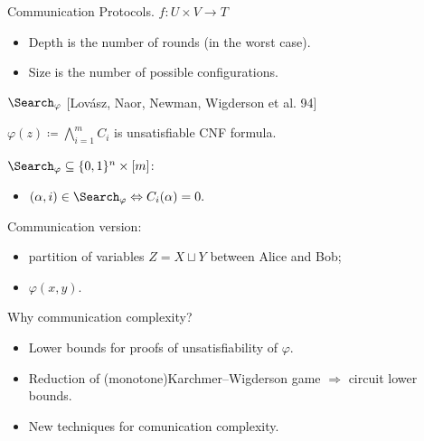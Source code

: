 \begin{frame}{Communication Protocols. $f\colon U \times V \to T$}
    \begin{center}
    	    
    \end{center}

    \pause
    \pause
    \pause
	\pause

    \begin{itemize}
        \item Depth is the number of rounds (in the worst case).
        \item Size is the number of possible configurations.
    \end{itemize}
\end{frame}

\begin{frame}{$\Search_{\varphi}$ [Lov{\'{a}}sz, Naor, Newman, Wigderson et al. 94]}

    $\varphi(z) \coloneqq \bigwedge\limits_{i = 1}^{m} C_i$ is unsatisfiable CNF formula.
    \pause
    
    $\Search_{\varphi} \subseteq \{0, 1\}^n \times [m]$:
    \begin{itemize}
        \item $(\alpha, i) \in \Search_{\varphi} \Leftrightarrow C_{i}(\alpha) = 0.$
    \end{itemize}
    
    \pause
    \vspace{0.4cm}
    Communication version:
    \begin{itemize}
        \item partition of variables $Z = X \sqcup Y$ between Alice and Bob;
        \item $\varphi(x, y)$.
    \end{itemize}

\end{frame}

\begin{frame}{Why communication complexity?}

    \begin{itemize}
        \item Lower bounds for proofs of unsatisfiability of $\varphi$.
        \item Reduction of (monotone)Karchmer--Wigderson game
            $\Rightarrow$ circuit lower bounds.
        \item New techniques for comunication complexity.
    \end{itemize}
\end{frame}

